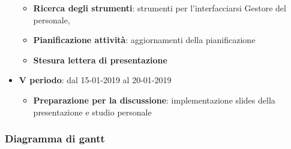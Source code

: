 \begin{itemize}
\begin{itemize}
       	        \item \textbf{Ricerca degli strumenti}: strumenti per l'interfacciarsi Gestore del personale, 
       	        \item \textbf{Pianificazione attività}: aggiornamenti della pianificazione
       	        \item \textbf{Stesura lettera di presentazione}
        	\end{itemize}
        	\item \textbf{V periodo}: dal 15-01-2019 al 20-01-2019
        	\begin{itemize}
    	        \item \textbf{Preparazione per la discussione}: implementazione slides della presentazione e studio personale
        	\end{itemize}
		\end{itemize}
		
            \subsubsection{Diagramma di gantt}

